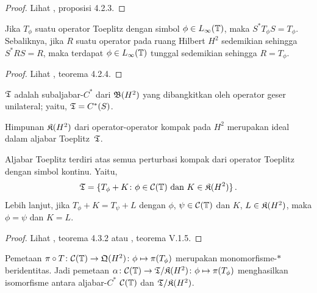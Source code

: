 \begin{proof} Lihat \cite{Arveson:2002}, proposisi 4.2.3.  \ns \end{proof}

\begin{prop} Jika $T_\phi$ suatu operator Toeplitz dengan simbol $\phi \in L_\infty(\mathbb{T})$, maka
$S^*T_\phi S = T_\phi$. Sebaliknya, jika $R$ suatu operator pada ruang Hilbert $H^2$
sedemikian sehingga $S^*RS = R$, maka terdapat $\phi \in L_\infty(\mathbb{T})$ tunggal sedemikian sehingga $R =
T_\phi$.
\end{prop}

\begin{proof} Lihat \cite{Arveson:2002}, teorema 4.2.4.  \ns \end{proof}

\begin{defn} 
 $\mathfrak{T}$ adalah subaljabar-$C^*$ dari $\mathfrak{B}(H^2)$ yang dibangkitkan oleh
operator geser unilateral; yaitu, $\mathfrak{T} = C^*(S)$.
\end{defn}

\begin{prop} Himpunan $\mathfrak{K}(H^2)$ dari operator-operator kompak pada $H^2$ merupakan ideal dalam aljabar
Toeplitz~$\mathfrak{T}$.
\end{prop}

\begin{prop} Aljabar Toeplitz terdiri atas semua perturbasi kompak dari operator Toeplitz
dengan simbol kontinu. Yaitu,
   \[ \mathfrak{T} = \{ T_\phi + K\colon \phi \in \mathcal{C}(\mathbb{T}) \text{ dan } K \in \mathfrak{K}(H^2)\} \,. \]
Lebih lanjut, jika $T_\phi + K = T_\psi + L$ dengan $\phi$, $\psi \in \mathcal{C}(\mathbb{T})$ dan $K$, $L
\in \mathfrak{K}(H^2)$, maka $\phi = \psi$ dan $K = L$.
\end{prop}

\begin{proof} Lihat \cite{Arveson:2002}, teorema 4.3.2 atau \cite{Davidson:1996}, teorema V.1.5.
\ns \end{proof}

\begin{prop}\label{005251} Pemetaan $\pi \circ T\colon \mathcal{C}(\mathbb{T}) \rightarrow \mathfrak{Q}(H^2)\colon \phi
\mapsto \pi(T_\phi)$ merupakan monomorfisme-$*\,$ beridentitas. Jadi pemetaan $\alpha\colon \mathcal{C}(\mathbb{T})
\rightarrow \mathfrak{T}/\mathfrak{K}(H^2)\colon \phi \mapsto \pi(T_\phi)$ menghasilkan isomorfisme
antara aljabar-$C^*$ $\mathcal{C}(\mathbb{T})$ dan $\mathfrak{T}/\mathfrak{K}(H^2)$.
\end{prop}

